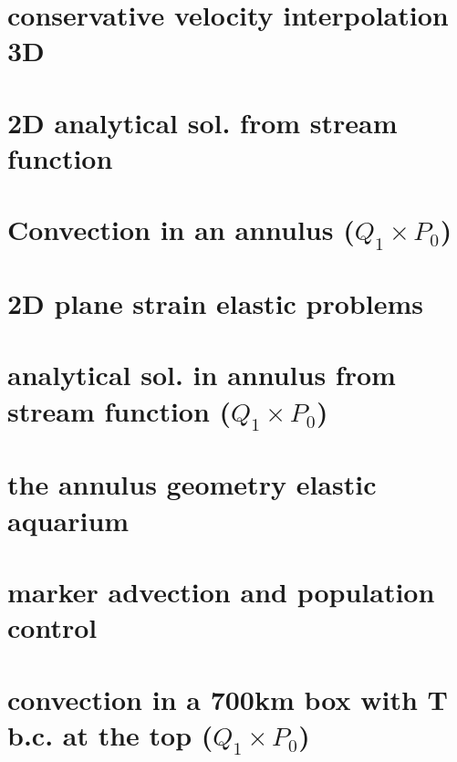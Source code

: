 \documentclass[a4paper,11pt]{report}
\begin{document}
\chapter{conservative velocity interpolation 3D \label{f31}} %

\chapter{2D analytical sol. from stream function \label{f32}} %

\chapter{Convection in an annulus  ($Q_1\times P_0$)  \label{f33}}

\chapter{2D plane strain elastic problems\label{f34}} 

\chapter{analytical sol. in annulus from stream function ($Q_1\times P_0$) \label{f35}}

\chapter{the annulus geometry elastic aquarium \label{f36}}%

\chapter{marker advection and population control \label{f37}}

\chapter{convection in a 700km box with T b.c. at the top  ($Q_1\times P_0$) \label{f38}} 
\end{document}
